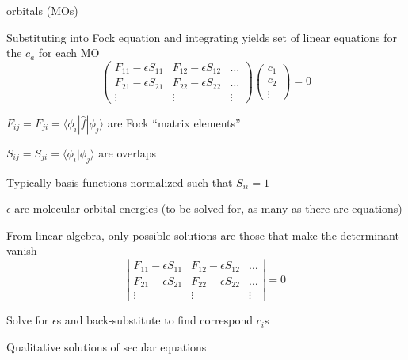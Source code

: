 \documentclass[11pt]{article}
\begin{document}
\begin{outline}
\begin{outline}
\begin{outline}
       orbitals (MOs)
     \item Substituting into Fock equation and integrating yields set of linear
       equations for the $c_a$ for each MO
       \begin{displaymath}
         \left ( \begin{array}{ccc}
           F_{11}-\epsilon S_{11} & F_{12}-\epsilon S_{12} & \ldots \\
           F_{21}-\epsilon S_{21} & F_{22}-\epsilon S_{22} & \ldots \\
           \vdots & \vdots & \vdots
         \end{array} \right ) \left (
         \begin{array}{c}
           c_1 \\
           c_2 \\
           \vdots
         \end{array} \right ) = 0
     \end{displaymath}
     \begin{outline}
     \item $F_{ij} = F_{ji} = \langle \phi_i | \hat f | \phi_j \rangle$ are Fock
       ``matrix elements''
     \item $S_{ij} = S_{ji} = \langle \phi_i | \phi_j \rangle$ are overlaps
     \item Typically basis functions normalized such that $S_{ii} = 1$
     \item $\epsilon$ are molecular orbital energies (to be solved for, as many
       as there are equations)
     \end{outline}
   \item From linear algebra, only possible solutions are those that make the
     determinant vanish
       \begin{displaymath}
         \left | \begin{array}{ccc}
           F_{11}-\epsilon S_{11} & F_{12}-\epsilon S_{12} & \ldots \\
           F_{21}-\epsilon S_{21} & F_{22}-\epsilon S_{22} & \ldots \\
           \vdots & \vdots & \vdots
         \end{array} \right | = 0
     \end{displaymath}
   \item Solve for $\epsilon$s and back-substitute to find correspond $c_i$s
   \end{outline}
 \item Qualitative solutions of secular equations
   \begin{outline}

\end{outline}
\end{outline}
\end{outline}
\end{document}
